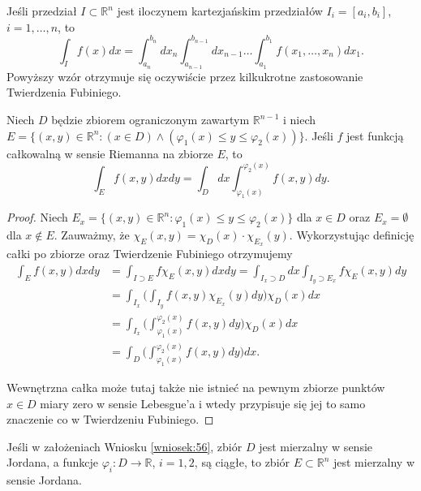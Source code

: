 \documentclass[leqno]{article}
\begin{document}
\begin{justify}
\begin{wniosek}
{
    Jeśli przedział $I \subset \mathbb{R}^n$ jest iloczynem kartezjańskim przedziałów $I_i = [a_i, b_i]$, $i = 1, \ldots, n$, to 
    \[
        \int_I f(x)dx = \int_{a_n}^{b_n}dx_n \int_{a_{n-1}}^{b_{n-1}}dx_{n-1} \ldots \int_{a_1}^{b_1}f(x_1, \ldots, x_n)dx_1.
    \]
    Powyższy wzór otrzymuje się oczywiście przez kilkukrotne zastosowanie Twierdzenia Fubiniego.
}
\end{wniosek}

\begin{wniosek}
{
    Niech $D$ będzie zbiorem ograniczonym zawartym $\mathbb{R}^{n-1}$ i niech $E = \{(x,y) \in \mathbb{R}^n : (x \in D) \land (\varphi_1(x) \leqslant y \leqslant \varphi_2(x))\}$.
    Jeśli $f$ jest funkcją całkowalną w sensie Riemanna na zbiorze $E$, to
    \[
        \int_E f(x,y)dxdy = \int_D dx \int_{\varphi_1(x)}^{\varphi_2(x)}f(x,y)dy.
    \]
}
\end{wniosek}

\begin{proof}
    Niech $E_x = \{(x,y) \in \mathbb{R}^n : \varphi_1(x) \leqslant y \leqslant \varphi_2(x)\}$ dla $x \in D$ oraz $E_x = \emptyset$ dla $x \notin E$.
    Zauważmy, że $\chi_E(x,y) = \chi_D(x) \cdot \chi_{E_x}(y)$. Wykorzystując definicję całki po zbiorze oraz Twierdzenie Fubiniego otrzymujemy 
    \[
        \begin{aligned}
            \int_E f(x,y)dxdy &= \int_{I \supset E}f \chi_E(x,y)dxdy = \int_{I_x \supset D}dx \int_{I_y \supset E_x}f \chi_E(x,y)dy \\
                &= \int_{I_x}\Big( \int_{I_y}f(x,y)\chi_{E_x}(y)dy \Big)\chi_D(x)dx \\
                &= \int_{I_x}\Big( \int_{\varphi_1(x)}^{\varphi_2(x)}f(x,y) dy\Big)\chi_D(x)dx \\
                &= \int_{D}\Big( \int_{\varphi_1(x)}^{\varphi_2(x)}f(x,y)dy \Big)dx.
        \end{aligned}
    \]

    Wewnętrzna całka może tutaj także nie istnieć na pewnym zbiorze punktów $x \in D$ miary zero w sensie Lebesgue'a i wtedy przypisuje się jej to samo znaczenie 
    co w Twierdzeniu Fubiniego.
\end{proof}

\begin{wniosek}
{
    Jeśli w założeniach Wniosku \ref{wniosek:56}, zbiór $D$ jest mierzalny w sensie Jordana, a funkcje $\varphi_i : D \to \mathbb{R}$, $i = 1,2$, są ciągłe,
    to zbiór $E \subset \mathbb{R}^n$ jest mierzalny w sensie Jordana.
}
\end{wniosek}


\end{justify}
\end{document}
